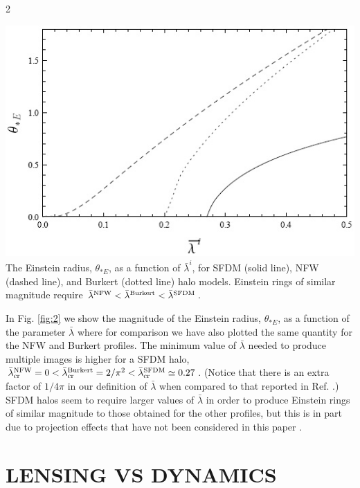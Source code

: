 \documentclass {article}
\begin{document}
\begin {multicols} {2}
\begin{minipage} {0.95\linewidth}
	\centering
	\includegraphics [width=0.95\linewidth] {fig_2}
	 {The Einstein radius, $\theta_{*E}$, as a function of $\bar{\lambda}^i$, for SFDM (solid line), NFW (dashed line), and Burkert (dotted line) halo models. Einstein rings of similar magnitude require $\bar{\lambda}^{\textup{NFW}} < \bar{\lambda}^{\textup{Burkert}} < \bar{\lambda}^{\textup{SFDM}}$.}
	\label {fig:2}
\end{minipage}

\bigskip

In Fig. \ref{fig:2} we show the magnitude of the Einstein radius, $\theta_{*E}$, as a function of the parameter $\bar{\lambda}$ where for comparison we have also plotted the same quantity for the NFW \cite{wright2000gravitational} and Burkert \cite{Park_2003} profiles. The minimum value of $\bar{\lambda}$ needed to produce multiple images is higher for a SFDM halo, $\bar{\lambda}_{\textup{cr}}^{\textup{NFW}} = 0 < \bar{\lambda}_{\textup{cr}}^{\textup{Burkert}} = 2 / \pi^2 < \bar{\lambda}_{\textup{cr}}^{\textup{SFDM}} \simeq 0.27$. (Notice that there is an extra factor of $ 1 / 4 \pi $ in our definition of $\bar{\lambda}$ when compared to that reported in Ref. \cite{Park_2003}.) SFDM halos seem to require larger values of $\bar{\lambda}$ in order to produce Einstein rings of similar magnitude to those obtained for the other profiles, but this is in part due to projection effects that have not been considered in this paper \cite{Kling_2008, Baltz_2009}.


\section {\normalsize {LENSING VS DYNAMICS}}



\end{multicols}
\end{document}
